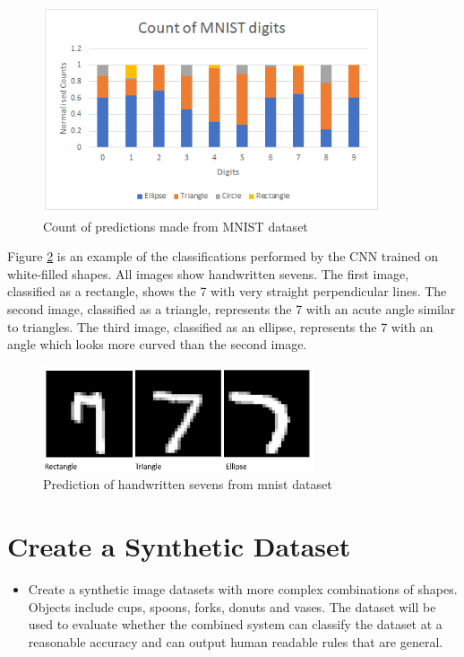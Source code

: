 \begin{figure}
	\begin{center}
		\includegraphics[width=100mm, scale=1]{graph_mnist.png}
		\caption{Count of predictions made from MNIST dataset}
		\label{fig:graph_mnist}
	\end{center}
	
\end{figure}
Figure \ref{fig:mnistseven} is an example of the classifications performed by the CNN trained on white-filled shapes. All images show handwritten sevens. The first image, classified as a rectangle, shows the 7 with very straight perpendicular lines. The second image, classified as a triangle, represents the 7 with an acute angle similar to triangles. The third image, classified as an ellipse, represents the 7 with an angle which looks more curved than the second image. 
\begin{figure}[H]
	\begin{center}
		\includegraphics[width=80mm, scale=1]{mnistseven.png}
		\caption{Prediction of handwritten sevens from mnist dataset}
		\label{fig:mnistseven}
	\end{center}
	
\end{figure}

\section{Create a Synthetic Dataset}
\begin{itemize}
	\item Create a synthetic image datasets with more complex combinations of shapes. Objects include cups, spoons, forks, donuts and vases. The dataset will be used to evaluate whether the combined system can classify the dataset at a reasonable accuracy and can output human readable rules that are general.  
\end{itemize}
